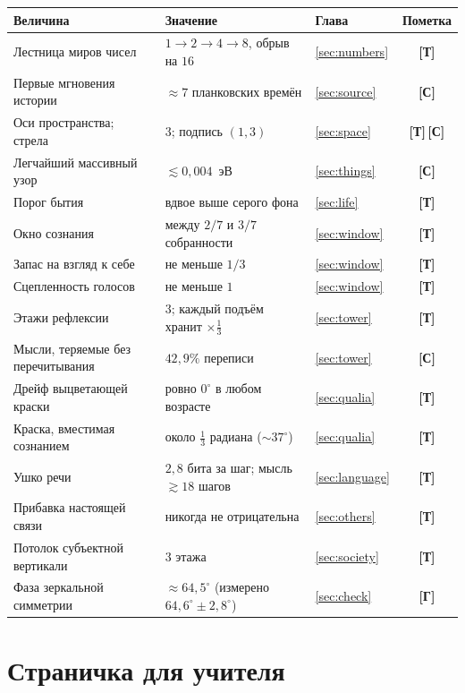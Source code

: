 \documentclass[11pt,letterpaper]{article}
\newcommand{\stT}{\textbf{[Т]}\xspace}
\newcommand{\stC}{\textbf{[С]}\xspace}
\newcommand{\stH}{\textbf{[Г]}\xspace}
\begin{document}
\begin{center}\small
\begin{tabular}{@{}lll c@{}}
\toprule
\textbf{Величина} & \textbf{Значение} & \textbf{Глава} & \textbf{Пометка} \\
\midrule
Лестница миров чисел & $1\to2\to4\to8$, обрыв на $16$ & \ref{sec:numbers} & \stT \\
Первые мгновения истории & $\approx 7$ планковских времён & \ref{sec:source} & \stC \\
Оси пространства; стрела & $3$; подпись $(1{,}3)$ & \ref{sec:space} & \stT\,\stC \\
Легчайший массивный узор & $\lesssim 0{,}004$~эВ & \ref{sec:things} & \stC \\
Порог бытия & вдвое выше серого фона & \ref{sec:life} & \stT \\
Окно сознания & между $2/7$ и $3/7$ собранности & \ref{sec:window} & \stT \\
Запас на взгляд к себе & не меньше $1/3$ & \ref{sec:window} & \stT \\
Сцепленность голосов & не меньше $1$ & \ref{sec:window} & \stT \\
Этажи рефлексии & $3$; каждый подъём хранит $\times\tfrac13$ & \ref{sec:tower} & \stT \\
Мысли, теряемые без перечитывания & $42{,}9\%$ переписи & \ref{sec:tower} & \stC \\
Дрейф выцветающей краски & ровно $0^\circ$ в любом возрасте & \ref{sec:qualia} & \stT \\
Краска, вместимая сознанием & около $\tfrac13$ радиана ($\sim 37^\circ$) & \ref{sec:qualia} & \stT \\
Ушко речи & $2{,}8$ бита за шаг; мысль $\gtrsim 18$ шагов & \ref{sec:language} & \stT \\
Прибавка настоящей связи & никогда не отрицательна & \ref{sec:others} & \stT \\
Потолок субъектной вертикали & $3$ этажа & \ref{sec:society} & \stT \\
Фаза зеркальной симметрии & $\approx 64{,}5^\circ$ (измерено $64{,}6^\circ\pm2{,}8^\circ$) & \ref{sec:check} & \stH \\
\bottomrule
\end{tabular}
\end{center}

\section*{Страничка для учителя}
\end{document}

